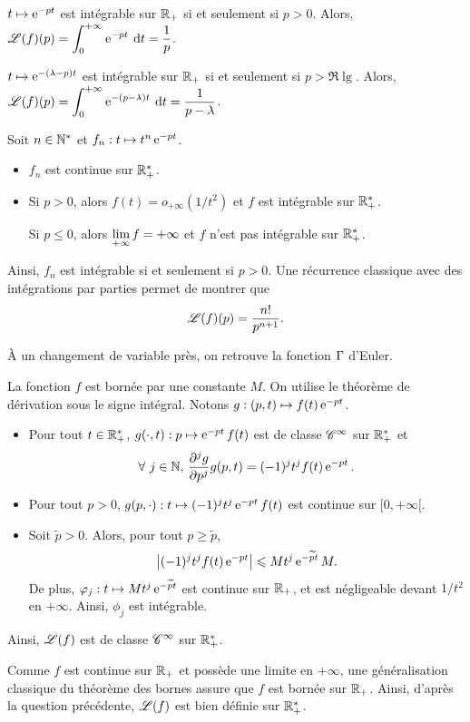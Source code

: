 \documentclass[oneside,11pt]{book}
\begin{document}
\begin{solution}
\Qu $t \mapsto \operatorname{e}^{-pt}$ est intégrable sur $\mathbb{R}_+$ si et seulement si $p > 0$. Alors, $\mathscr{L}(f)(p) = \displaystyle \int_0^{+\infty} \operatorname{e}^{-pt} \:{\text d}t = \frac{1}{p}$.

\squ $t \mapsto \operatorname{e}^{-(\lambda-p)t}$ est intégrable sur $\mathbb{R}_+$ si et seulement si $p > \Re{\lg}$. Alors, $\mathscr{L}(f)(p) = \displaystyle \int_0^{+\infty} \operatorname{e}^{-(p-\lambda)t} \:{\text d}t = \frac{1}{p-\lambda}$.

\squ Soit $n \in \mathbb{N}^*$ et $f_n : t \mapsto t^n \operatorname{e}^{-pt}$.
\begin{itemize}
\item $f_n$ est continue sur $\mathbb{R}_+^*$.
\item Si $p > 0$, alors $f(t) = o_{+\infty}(1/t^2)$ et $f$ est intégrable sur $\mathbb{R}_+^*$.

Si $p \leq 0$, alors $\lim\limits_{+\infty} f = +\infty$ et $f$ n'est pas intégrable sur $\mathbb{R}_+^*$.
\end{itemize}
Ainsi, $f_n$ est intégrable si et seulement si $p > 0$. Une récurrence classique avec des intégrations par parties permet de montrer que
\[
\mathscr{L}(f)(p) = \frac{n!}{p^{n+1}}.
\]

 À un changement de variable près, on retrouve la fonction $\Gamma$ d'Euler.

\qu La fonction $f$ est bornée par une constante $M$. On utilise le théorème de dérivation sous le signe intégral. Notons $g : (p, t) \mapsto f(t) \operatorname{e}^{-pt}$.
\begin{itemize}
\item Pour tout $t \in \mathbb{R}_+^*$, $g(\cdot, t) : p \mapsto \operatorname{e}^{-p t} f(t)$ est de classe $\mathscr{C}^\infty$ sur $\mathbb{R}_+^*$ et
\[
\forall~ j \in \mathbb{N},\, \frac{\partial^j g}{\partial p^j} g(p, t) = (-1)^j t^j f(t) \operatorname{e}^{-pt}.
\]

\item Pour tout $p > 0$, $g(p, \cdot) : t \mapsto (-1)^j t^j \operatorname{e}^{-p t} f(t)$ est continue sur $[0,+\infty[$.

\item Soit $\tilde{p} > 0$. Alors, pour tout $p \geq \tilde{p}$,
\[
\left\lvert(-1)^j t^j f(t) \operatorname{e}^{-p t}\right\rvert \leqslant M t^j \operatorname{e}^{- \widetilde{p} t} M.
\]
De plus, $\varphi_j : t \mapsto M t^j \operatorname{e}^{-\widetilde{p} t}$ est continue sur $\mathbb{R}_+$, et est négligeable devant $1/t^2$ en $+\infty$. Ainsi, $\phi_j$ est intégrable.
\end{itemize}
Ainsi, $\mathscr{L}(f)$ est de classe $\mathscr{C}^\infty$ sur $\mathbb{R}_+^*$.

\qu Comme $f$ est continue sur $\mathbb{R}_+$ et possède une limite en $+\infty$, une généralisation classique du théorème des bornes assure que $f$ est bornée sur $\mathbb{R}_+$. Ainsi, d'après la question précédente, $\mathscr{L}(f)$ est bien définie sur $\mathbb{R}_+^*$.


\end{solution}
\end{document}

